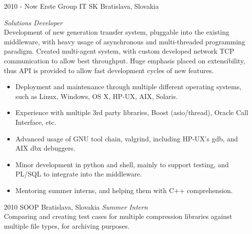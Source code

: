 \documentclass[]{friggeri-cv} %
\begin{document}
\begin{entrylist}
\entry
{2010 - Now}
{Erste Group IT SK}
{Bratislava, Slovakia}
{\emph{Solutions Developer} \\
Development of new generation transfer system, pluggable into the existing middleware, with heavy usage of asynchronous and multi-threaded programming paradigm. Created multi-agent system, with custom developed network TCP communication to allow best throughput. Huge emphasis placed on extensibility, thus API is provided to allow fast development cycles of new features.

\begin{itemize}
\item Deployment and maintenance through multiple different operating systems, such as Linux, Windows, OS X, HP-UX, AIX, Solaris.
\item Experience with multiple 3rd party libraries, Boost (asio/thread), Oracle Call Interface, etc. 
\item Advanced usage of GNU tool chain, valgrind, including HP-UX's gdb, and AIX dbx debuggers. 
\item Minor development in python and shell, mainly to support testing, and PL/SQL to integrate into the middleware.

\item Mentoring summer interns, and helping them with C++ comprehension.
\end{itemize}}

\entry
{2010}
{SOOP}
{Bratislava, Slovakia}
{\emph{Summer Intern} \\
Comparing and creating test cases for multiple compression libraries against multiple file types, for archiving purposes.}
\end{entrylist}

\end{document}
